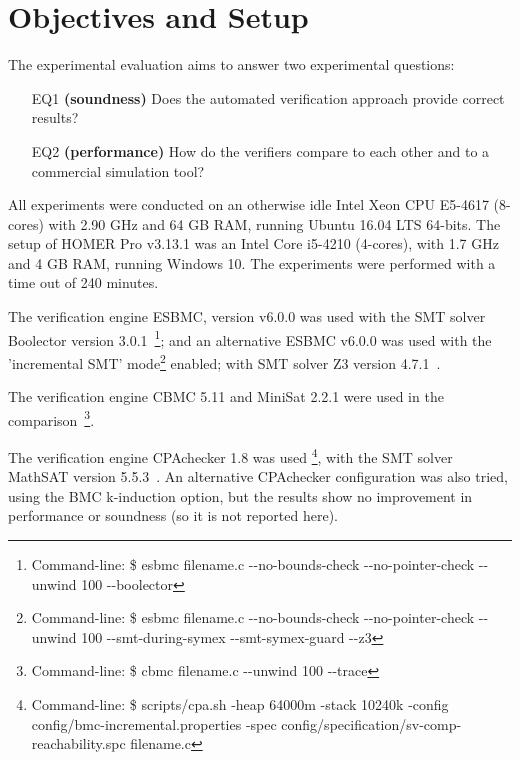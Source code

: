 \section{Objectives and Setup}
\label{sec:setup}

The experimental evaluation aims to answer two experimental questions:
%
\begin{enumerate}
\item[EQ1] \textbf{(soundness)} Does the automated verification approach provide correct results?
\item[EQ2] \textbf{(performance)} How do the verifiers compare to each other and to a commercial simulation tool?
\end{enumerate}

%
All experiments were conducted on an otherwise idle Intel Xeon CPU E5-4617 (8-cores) with 2.90 GHz and 64 GB RAM, running Ubuntu 16.04 LTS 64-bits. The setup of HOMER Pro v3.13.1 was an Intel Core i5-4210 (4-cores), with 1.7 GHz and 4 GB RAM, running Windows 10. The experiments were performed with a time out of 240 minutes.

The verification engine ESBMC, version v6.0.0 was used with the SMT solver Boolector version 3.0.1~\cite{Brummayer}\footnote{Command-line: \$ esbmc filename.c -\phantom{}-no-bounds-check -\phantom{}-no-pointer-check -\phantom{}-unwind 100 -\phantom{}-boolector}; and an alternative ESBMC v6.0.0 was used with the 'incremental SMT' mode\footnote{Command-line: \$ esbmc filename.c -\phantom{}-no-bounds-check -\phantom{}-no-pointer-check -\phantom{}-unwind 100 -\phantom{}-smt-during-symex -\phantom{}-smt-symex-guard -\phantom{}-z3} enabled; with SMT solver Z3 version 4.7.1~\cite{DeMoura}. %

The verification engine CBMC 5.11 and MiniSat 2.2.1 were used in the comparison~\cite{Kroening}\footnote{Command-line: \$ cbmc filename.c -\phantom{}-unwind 100 -\phantom{}-trace}.
 
The verification engine CPAchecker 1.8 was used \footnote{Command-line: \$ scripts/cpa.sh -heap 64000m -stack 10240k -config config/bmc-incremental.properties -spec config/specification/sv-comp-reachability.spc filename.c}, with the SMT solver MathSAT version 5.5.3~\cite{mathsat5}. An alternative CPAchecker configuration was also tried, using the BMC k-induction option, but the results show no improvement in performance or soundness (so it is not reported here).

